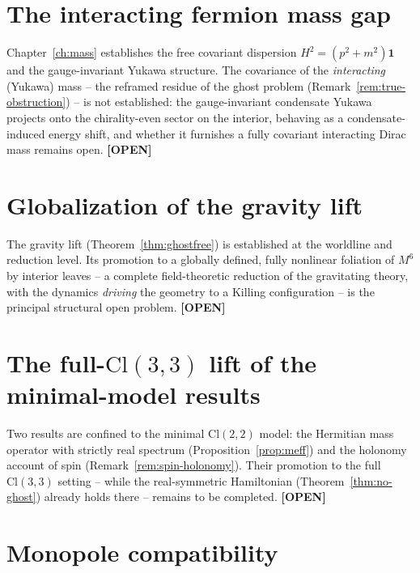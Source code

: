 \documentclass[11pt,oneside]{book}
\newcommand{\Cl}{\mathrm{Cl}}                     %
\newcommand{\status}[1]{{\sffamily\bfseries\color{statuscol}[#1]}}
\theoremstyle{plain}
\theoremstyle{definition}
\theoremstyle{remark}
\begin{document}
\section{The interacting fermion mass gap}
\label{sec:open-massgap}

Chapter~\ref{ch:mass} establishes the free covariant dispersion
$H^2=(p^2+m^2)\mathbf 1$ and the gauge-invariant Yukawa structure. The covariance of
the \emph{interacting} (Yukawa) mass -- the reframed residue of the ghost problem
(Remark~\ref{rem:true-obstruction}) -- is not established: the gauge-invariant
condensate Yukawa projects onto the chirality-even sector on the interior, behaving
as a condensate-induced energy shift, and whether it furnishes a fully covariant
interacting Dirac mass remains open. \status{OPEN}

\section{Globalization of the gravity lift}
\label{sec:open-global}

The gravity lift (Theorem~\ref{thm:ghostfree}) is established at the worldline and
reduction level. Its promotion to a globally defined, fully nonlinear foliation of
$M^6$ by interior leaves -- a complete field-theoretic reduction of the gravitating
theory, with the dynamics \emph{driving} the geometry to a Killing configuration --
is the principal structural open problem. \status{OPEN}

\section{The full-$\Cl(3,3)$ lift of the minimal-model results}
\label{sec:open-minimal}

Two results are confined to the minimal $\Cl(2,2)$ model: the Hermitian mass
operator with strictly real spectrum (Proposition~\ref{prop:meff}) and the holonomy
account of spin (Remark~\ref{rem:spin-holonomy}). Their promotion to the full
$\Cl(3,3)$ setting -- while the real-symmetric Hamiltonian
(Theorem~\ref{thm:no-ghost}) already holds there -- remains to be completed.
\status{OPEN}

\section{Monopole compatibility}
\label{sec:open-monopole}
\end{document}
